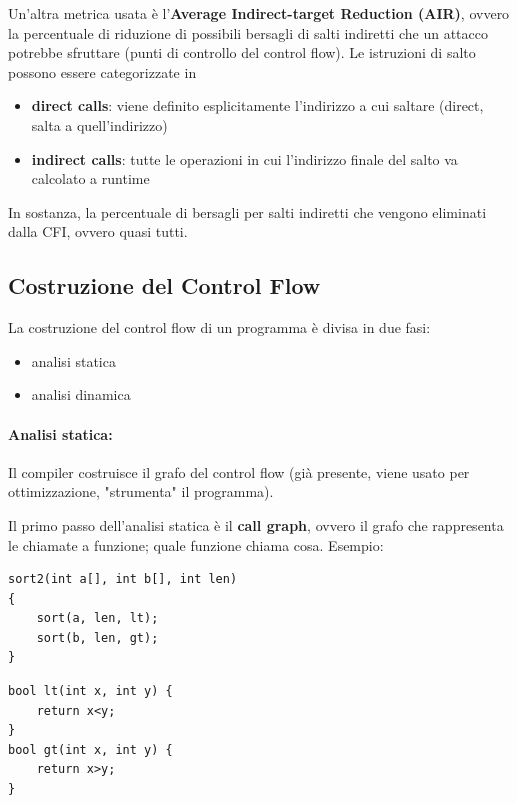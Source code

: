 Un'altra metrica usata è l'\textbf{Average Indirect-target Reduction (AIR)}, ovvero la percentuale di riduzione di possibili bersagli di salti indiretti che un attacco potrebbe sfruttare (punti di controllo del control flow). Le istruzioni di salto possono essere categorizzate in 
\begin{itemize}
	\item \textbf{direct calls}: viene definito esplicitamente l'indirizzo a cui saltare (direct, salta a quell'indirizzo)
    
	\item \textbf{indirect calls}: tutte le operazioni in cui l'indirizzo finale del salto va calcolato a runtime
\end{itemize}
In sostanza, la percentuale di bersagli per salti indiretti che vengono eliminati dalla CFI, ovvero quasi tutti.

\subsection{Costruzione del Control Flow}

La costruzione del control flow di un programma è divisa in due fasi: 
\begin{itemize}
	\item analisi statica
    
	\item analisi dinamica
\end{itemize}

\paragraph{Analisi statica:} Il compiler costruisce il grafo del control flow (già presente, viene usato per ottimizzazione, "strumenta" il programma). 

Il primo passo dell'analisi statica è il \textbf{call graph}, ovvero il grafo che rappresenta le chiamate a funzione; quale funzione chiama cosa. Esempio: 

\begin{center}
	\begin{minipage}[h]{0.52\textwidth}
		\begin{verbatim}
sort2(int a[], int b[], int len)
{
	sort(a, len, lt);
	sort(b, len, gt);
}
		\end{verbatim}
	\end{minipage}
    \hfill 
	\begin{minipage}[h]{0.37\textwidth}
		\begin{verbatim}
bool lt(int x, int y) {
	return x<y;
}
bool gt(int x, int y) {
	return x>y;
}
		\end{verbatim}
	\end{minipage}
\end{center}


